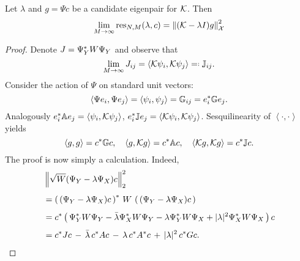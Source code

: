 \begin{theorem}
    \label{thm:res_M_limit}
    Let $\lambda$ and $g = \Psi c$ be a candidate eigenpair for $\mathcal{K}$. Then 
    \begin{equation}
        \lim_{M \to \infty} \text{res}_{N,M} (\lambda, c)
        = \left\| (\mathcal{K} - \lambda I) g \right\|_{\mathcal{X}}^2
    \end{equation}
\end{theorem}

\begin{proof}
    Denote $J = \Psi_Y^* W \Psi_Y$ and observe that
    \begin{equation}
        \label{eq:J}
        \lim_{M \to \infty} J_{i j} = 
        \left\langle \scrK \psi_i, \scrK \psi_j \right\rangle \eqdef \bbJ_{i j} . 
    \end{equation}
    Consider the action of $\Psi$ on standard unit vectors:
    \begin{equation}
        \left\langle \Psi e_i, \Psi e_j \right\rangle 
        = \left\langle \psi_i, \psi_j \right\rangle 
        = \mathbb{G}_{i j} 
        = e_i^* \mathbb{G} e_j . 
    \end{equation}
    Analogously $e_i^* \mathbb{A} e_j = \left\langle \psi_i, \mathcal{K} \psi_j \right\rangle$, 
    $e_i^* \mathbb{J} e_j = \left\langle \mathcal{K} \psi_i, \mathcal{K} \psi_j \right\rangle$. 
    Sesquilinearity of $\left\langle \cdot, \cdot \right\rangle$ yields 
    \begin{equation}
        \left\langle g, g \right\rangle = c^* \mathbb{G} c, \quad 
        \left\langle g, \mathcal{K} g \right\rangle = c^* \mathbb{A} c, \quad 
        \left\langle \mathcal{K} g, \mathcal{K} g \right\rangle = c^* \mathbb{J} c . 
    \end{equation}
    The proof is now simply a calculation. Indeed,
    \begin{equation}
        \label{eq:reg_error}
        \begin{split}
            &\left\| \sqrt{W} ( \Psi_Y - \lambda \Psi_X ) c \right\|_2^2 \\[1ex]
            &= \left(\, ( \Psi_Y - \lambda \Psi_X ) c \,\right)^* \,W\, \left(\, ( \Psi_Y - \lambda \Psi_X ) c \,\right) \\[1ex]
            &= c^* \left(\, 
                \Psi_Y^* W \Psi_Y - \bar{\lambda} \Psi_X^* W \Psi_Y - \lambda \Psi_Y^* W \Psi_X + | \lambda |^2 \Psi_X^* W \Psi_X \,\right) c \\[1ex]
            &= c^* J c \,-\, \bar{\lambda}\, c^* A c \,-\, \lambda\, c^* A^* c \,+\, | \lambda |^2\, c^* G c . 
        \end{split}
    \end{equation}

\end{proof}
